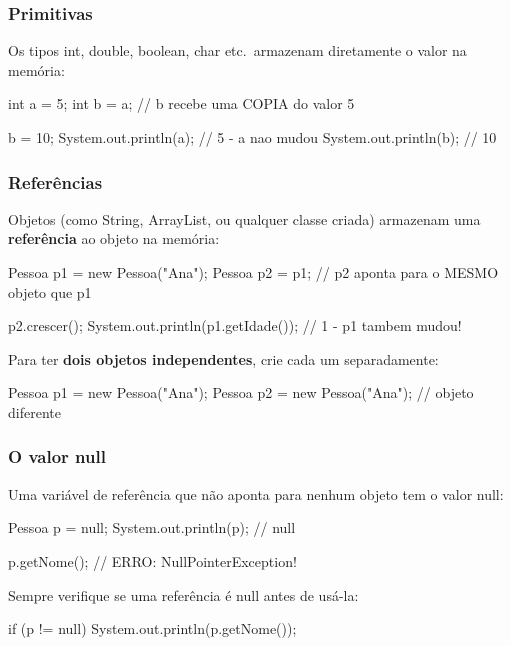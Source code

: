 \documentclass[11pt,a4paper]{article}
\renewcommand{\texttt}[1]{{\color{javaCodeInline}\small\ttfamily #1}}
\begin{document}
\subsubsection{Primitivas}

Os tipos \texttt{int}, \texttt{double}, \texttt{boolean}, \texttt{char} etc.\ armazenam diretamente o valor na memória:

\begin{javacode}
int a = 5;
int b = a; // b recebe uma COPIA do valor 5

b = 10;
System.out.println(a); // 5 - a nao mudou
System.out.println(b); // 10
\end{javacode}

\subsubsection{Referências}

Objetos (como \texttt{String}, \texttt{ArrayList}, ou qualquer classe criada) armazenam uma \textbf{referência} ao objeto na memória:

\begin{javacode}
Pessoa p1 = new Pessoa("Ana");
Pessoa p2 = p1; // p2 aponta para o MESMO objeto que p1

p2.crescer();
System.out.println(p1.getIdade()); // 1 - p1 tambem mudou!
\end{javacode}

Para ter \textbf{dois objetos independentes}, crie cada um separadamente:

\begin{javacode}
Pessoa p1 = new Pessoa("Ana");
Pessoa p2 = new Pessoa("Ana"); // objeto diferente
\end{javacode}

\subsubsection{O valor \texttt{null}}

Uma variável de referência que não aponta para nenhum objeto tem o valor \texttt{null}:

\begin{javacode}
Pessoa p = null;
System.out.println(p); // null

p.getNome(); // ERRO: NullPointerException!
\end{javacode}

Sempre verifique se uma referência é \texttt{null} antes de usá-la:

\begin{javacode}
if (p != null) {
    System.out.println(p.getNome());
}
\end{javacode}
\end{document}
